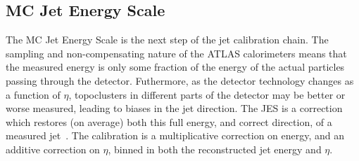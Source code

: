\subsection{MC Jet Energy Scale}
\label{jet-reconstruction:jet-calibration-mc-jet-energy-scale}

The MC Jet Energy Scale is the next step of the jet calibration chain. The sampling and non-compensating nature of the ATLAS calorimeters means that the measured energy is only some fraction of the energy of the actual particles passing through the detector. Futhermore, as the detector technology changes as a function of $\eta$, topoclusters in different parts of the detector may be better or worse measured, leading to biases in the jet direction. The JES is a correction which restores (on average) both this full energy, and correct direction, of a measured jet~\cite{JES2010}. The calibration is a multiplicative correction on energy, and an additive correction on $\eta$, binned in both the reconstructed jet energy and $\eta$.

